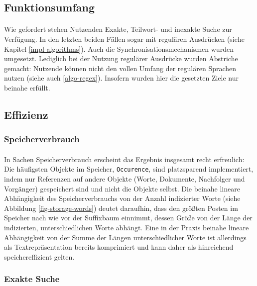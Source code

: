 \subsection{Funktionsumfang}

\paragraph{} Wie gefordert stehen Nutzenden Exakte, Teilwort- und inexakte Suche zur Verfügung. In den letzten beiden Fällen sogar mit regulären Ausdrücken (siehe Kapitel \ref{impl-algorithms}). Auch die Synchronisationsmechanismen wurden umgesetzt. Lediglich bei der Nutzung regulärer Ausdrücke wurden Abstriche gemacht: Nutzende können nicht den vollen Umfang der regulären Sprachen nutzen (siehe auch \ref{algo-regex}). Insofern wurden hier die gesetzten Ziele nur beinahe erfüllt.

\subsection{Effizienz}
\label{fazit-eficiency}

\subsubsection{Speicherverbrauch}

\paragraph{} In Sachen Speicherverbrauch erscheint das Ergebnis insgesamt recht erfreulich: Die häufigsten Objekte im Speicher, \texttt{Occurence}, sind platzsparend implementiert, indem nur Referenzen auf andere Objekte (Worte, Dokumente, Nachfolger und Vorgänger) gespeichert sind und nicht die Objekte selbst. Die beinahe lineare Abhängigkeit des Speicherverbrauchs von der Anzahl indizierter Worte (siehe Abbildung \ref{fig-storage-words}) deutet daraufhin, dass den größten Posten im Speicher nach wie vor der Suffixbaum einnimmt, dessen Größe von der Länge der indizierten, unterschiedlichen Worte abhängt. Eine in der Praxis beinahe lineare Abhängigkeit von der Summe der Längen unterschiedlicher Worte ist allerdings als Textrepräsentation bereits komprimiert und kann daher als hinreichend speichereffizient gelten.

\subsubsection{Exakte Suche}

